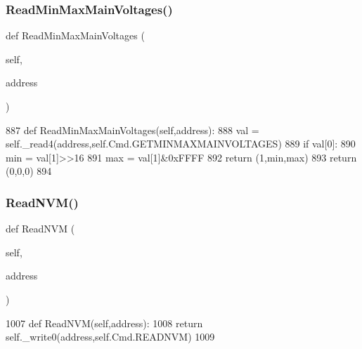 \subsubsection{\texorpdfstring{Read\+Min\+Max\+Main\+Voltages()}{ReadMinMaxMainVoltages()}}
{\footnotesize\ttfamily def Read\+Min\+Max\+Main\+Voltages (\begin{DoxyParamCaption}\item[{}]{self,  }\item[{}]{address }\end{DoxyParamCaption})}


\begin{DoxyCode}
887     \textcolor{keyword}{def }ReadMinMaxMainVoltages(self,address):
888         val = self.\_read4(address,self.Cmd.GETMINMAXMAINVOLTAGES)
889         \textcolor{keywordflow}{if} val[0]:
890             min = val[1]>>16
891             max = val[1]&0xFFFF
892             \textcolor{keywordflow}{return} (1,min,max)
893         \textcolor{keywordflow}{return} (0,0,0)
894 
\end{DoxyCode}
\mbox{\label{classtoxic__hardware_1_1roboclaw__3_1_1Roboclaw_a9758a592cc718d5ccc89d45e785d9662}} 
\subsubsection{\texorpdfstring{Read\+N\+V\+M()}{ReadNVM()}}
{\footnotesize\ttfamily def Read\+N\+VM (\begin{DoxyParamCaption}\item[{}]{self,  }\item[{}]{address }\end{DoxyParamCaption})}


\begin{DoxyCode}
1007     \textcolor{keyword}{def }ReadNVM(self,address):
1008         \textcolor{keywordflow}{return} self.\_write0(address,self.Cmd.READNVM)
1009 
\end{DoxyCode}
\mbox{\label{classtoxic__hardware_1_1roboclaw__3_1_1Roboclaw_a514dcfe31df7d312ed3d2a45666500c3}} 
